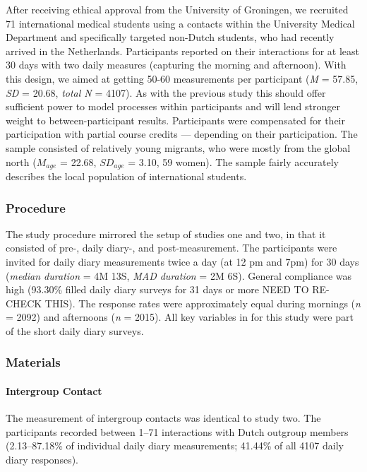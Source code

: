 After receiving ethical approval from the University of Groningen, we
recruited 71 international medical students using a contacts within the
University Medical Department and specifically targeted non-Dutch
students, who had recently arrived in the Netherlands. Participants
reported on their interactions for at least 30 days with two daily
measures (capturing the morning and afternoon). With this design, we
aimed at getting 50-60 measurements per participant (\textit{M} = 57.85,
\textit{SD} = 20.68, \textit{total N} = 4107). As with the previous
study this should offer sufficient power to model processes within
participants and will lend stronger weight to between-participant
results. Participants were compensated for their participation with
partial course credits --- depending on their participation. The sample
consisted of relatively young migrants, who were mostly from the global
north (\(M_{age}\) = 22.68, \(SD_{age}\) = 3.10, 59 women). The sample
fairly accurately describes the local population of international
students.

\subsubsection{Procedure}

The study procedure mirrored the setup of studies one and two, in that
it consisted of pre-, daily diary-, and post-measurement. The
participants were invited for daily diary measurements twice a day (at
12 pm and 7pm) for 30 days (\textit{median duration} = 4M 13S,
\textit{MAD duration} = 2M 6S). General compliance was high (93.30\%
filled daily diary surveys for 31 days or more NEED TO RE-CHECK THIS).
The response rates were approximately equal during mornings (\textit{n}
= 2092) and afternoons (\textit{n} = 2015). All key variables in for
this study were part of the short daily diary surveys.

\subsubsection{Materials}

\paragraph{Intergroup Contact}

The measurement of intergroup contacts was identical to study two. The
participants recorded between 1--71 interactions with Dutch outgroup
members (2.13--87.18\% of individual daily diary measurements; 41.44\%
of all 4107 daily diary responses).

